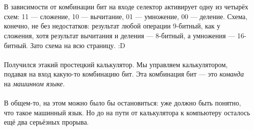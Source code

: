 \documentclass[11pt]{book}
\begin{document}
\\ \\
В зависимости от комбинации бит на входе селектор активирует одну из четырёх схем: 11 --- сложение, 10 --- вычитание, 01 --- умножение, 00 --- деление.
Схема, конечно, не без недостатков: результат любой операции 9-битный, как у сложения, хотя результат вычитания и деления --- 8-битный, а умножения --- 16-битный.
Зато схема на всю страницу. :D
\\ \\
Получился этакий простецкий калькулятор.
Мы управляем калькулятором, подавая на вход какую-то комбинацию бит.
Эта комбинация бит --- это \emph{команда} на \emph{машинном языке}.
\\ \\
В общем-то, на этом можно было бы остановиться: уже должно быть понятно, что такое машинный язык.
Но до на пути от калькулятора к компьютеру осталось ещё два серьёзных прорыва.
\end{document}
